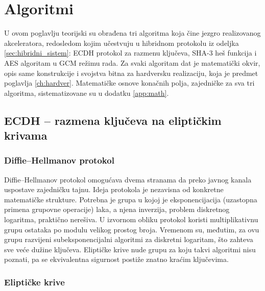 \chapter{Algoritmi}
\label{ch:algoritmi}

U ovom poglavlju teorijski su obrađena tri algoritma koja čine jezgro realizovanog akceleratora, redosledom kojim učestvuju u hibridnom protokolu iz odeljka \ref{sec:hibridni_sistem}: ECDH protokol za razmenu ključeva, SHA-3 heš funkcija i AES algoritam u GCM režimu rada. Za svaki algoritam dat je matematički okvir, opis same konstrukcije i svojstva bitna za hardversku realizaciju, koja je predmet poglavlja \ref{ch:hardver}. Matematičke osnove konačnih polja, zajedničke za sva tri algoritma, sistematizovane su u dodatku \ref{app:math}.

\section{ECDH -- razmena ključeva na eliptičkim krivama}
\label{sec:ecdh}

\subsection{Diffie--Hellmanov protokol}
\label{subsec:dh_protokol}

Diffie--Hellmanov protokol \cite{diffie_hellman} omogućava dvema stranama da preko javnog kanala uspostave zajedničku tajnu. Ideja protokola je nezavisna od konkretne matematičke strukture. Potrebna je grupa u kojoj je eksponencijacija (uzastopna primena grupovne operacije) laka, a njena inverzija, problem diskretnog logaritma, praktično nerešiva. U izvornom obliku protokol koristi multiplikativnu grupu ostataka po modulu velikog prostog broja. Vremenom su, međutim, za ovu grupu razvijeni subeksponencijalni algoritmi za diskretni logaritam, što zahteva sve veće dužine ključeva. Eliptičke krive nude grupu za koju takvi algoritmi nisu poznati, pa se ekvivalentna sigurnost postiže znatno kraćim ključevima.

\subsection{Eliptičke krive}
\label{subsec:elipticke_krive}

